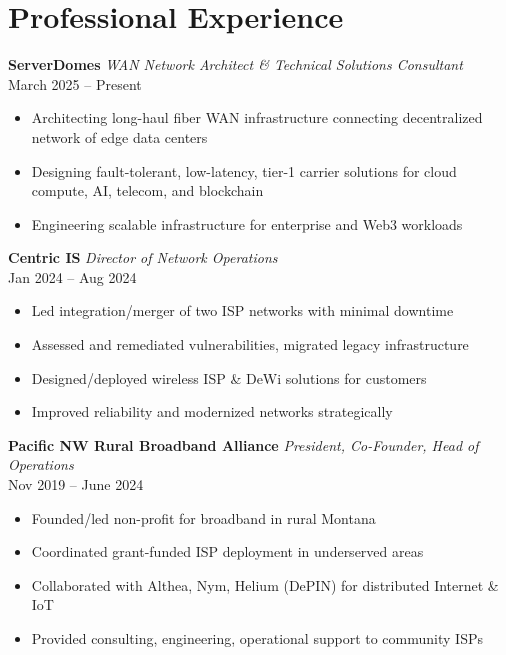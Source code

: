 \documentclass[11pt,a4paper]{article}
\begin{document}
\section*{Professional Experience}

\textbf{ServerDomes} \hfill \emph{WAN Network Architect \& Technical Solutions Consultant}\\
March 2025 -- Present\\
\begin{itemize}[leftmargin=1.2em]
    \item Architecting long-haul fiber WAN infrastructure connecting decentralized network of edge data centers
    \item Designing fault-tolerant, low-latency, tier-1 carrier solutions for cloud compute, AI, telecom, and blockchain
    \item Engineering scalable infrastructure for enterprise and Web3 workloads
\end{itemize}

\textbf{Centric IS} \hfill \emph{Director of Network Operations}\\
Jan 2024 -- Aug 2024 \\
\begin{itemize}[leftmargin=1.2em]
    \item Led integration/merger of two ISP networks with minimal downtime
    \item Assessed and remediated vulnerabilities, migrated legacy infrastructure
    \item Designed/deployed wireless ISP \& DeWi solutions for customers
    \item Improved reliability and modernized networks strategically
\end{itemize}

\textbf{Pacific NW Rural Broadband Alliance} \hfill \emph{President, Co-Founder, Head of Operations}\\
Nov 2019 -- June 2024\\
\begin{itemize}[leftmargin=1.2em]
    \item Founded/led non-profit for broadband in rural Montana
    \item Coordinated grant-funded ISP deployment in underserved areas
    \item Collaborated with Althea, Nym, Helium (DePIN) for distributed Internet \& IoT
    \item Provided consulting, engineering, operational support to community ISPs
\end{itemize}
\end{document}
